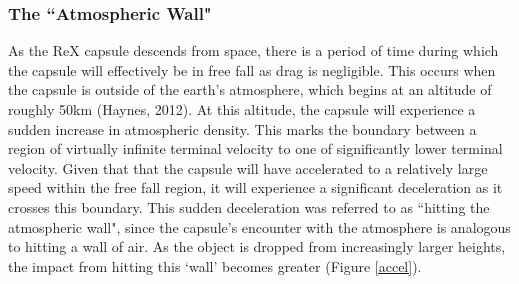 \documentclass{article}
\begin{document}
\begin{doublespace}
		\subsubsection{The ``Atmospheric Wall"}
		\indent\indent As the ReX capsule descends from space, there is a period of time during which the capsule will effectively be in free fall as drag is negligible. This occurs when the capsule is outside of the earth's atmosphere, which begins at an altitude of roughly 50km (Haynes, 2012). At this altitude, the capsule will experience a sudden increase in atmospheric density. This marks the boundary between a region of virtually infinite terminal velocity to one of significantly lower terminal velocity. Given that that the capsule will have accelerated to a relatively large speed within the free fall region, it will experience a significant deceleration as it crosses this boundary. This sudden deceleration was referred to as ``hitting the atmospheric wall", since the capsule's encounter with the atmosphere is analogous to hitting a wall of air. As the object is dropped from increasingly larger heights, the impact from hitting this `wall' becomes greater (Figure \ref{accel}).

\end{doublespace}
\end{document}
